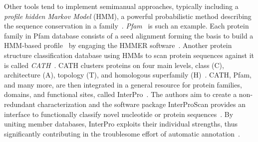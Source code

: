 Other tools tend to implement semimanual approaches, typically including a
\emph{profile hidden Markov Model} (HMM), a powerful probabilistic method describing the
sequence conservation in a family~\cite{krogh1994hidden, eddy1996hidden}.
\emph{Pfam}~\cite{sonnhammer1997pfam} is such an example.
Each protein family in Pfam database consists of a seed alignment forming the basis to
build a HMM-based profile~\cite{el2019pfam} by engaging the HMMER
software~\cite{finn2010pfam, finn2011hmmer}.
Another protein structure classification database using HMMs to scan protein sequences
against it is called \emph{CATH}~\cite{dawson2017cath}.
CATH clusters proteins on four main levels, class (C), architecture (A), topology (T), and
homologous superfamily (H)~\cite{orengo1997cath}.
CATH, Pfam, and many more, are then integrated in a general resource for protein families,
domains, and functional sites, called InterPro~\cite{finn2017interpro}.
The authors aim to create a non-redundant characterization and the software package
InterProScan provides an interface to functionally classify novel nucleotide or protein
sequences~\cite{zdobnov2001interproscan}.
By uniting member databases, InterPro exploits their individual strengths, thus
significantly contributing in the troublesome effort of automatic
annotation~\cite{apweiler2000interpro}.





